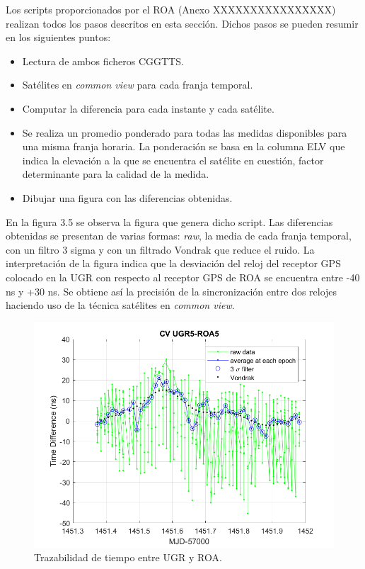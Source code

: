 Los scripts proporcionados por el ROA (Anexo XXXXXXXXXXXXXXXX) realizan todos los pasos descritos en esta sección. Dichos pasos se pueden resumir en los siguientes puntos:

\begin{itemize}
	\item Lectura de ambos ficheros CGGTTS.
	\item Satélites en \textit{common view} para cada franja temporal.
	\item Computar la diferencia para cada instante y cada satélite.
	\item Se realiza un promedio ponderado para todas las medidas disponibles para una misma franja horaria. La ponderación se basa en la columna ELV que indica la elevación a la que se encuentra el satélite en cuestión, factor determinante para la calidad de la medida.
	\item Dibujar una figura con las diferencias obtenidas.
\end{itemize}

En la figura 3.5 se observa la figura que genera dicho script. Las diferencias obtenidas se presentan de varias formas: \textit{raw}, la media de cada franja temporal, con un filtro 3 sigma y con un filtrado Vondrak que reduce el ruido. La interpretación de la figura indica que la desviación del reloj del receptor GPS colocado en la UGR con respecto al receptor GPS de ROA se encuentra entre -40 ns y +30 ns. Se obtiene así la precisión de la sincronización entre dos relojes haciendo uso de la técnica satélites en \textit{common view}.

\begin{figure} 
	\centering
	\includegraphics[width=1\textwidth]{imagenes/resultado_cv2.PNG}
	\caption{\label{fig1}Trazabilidad de tiempo entre UGR y ROA.}
\end{figure}


